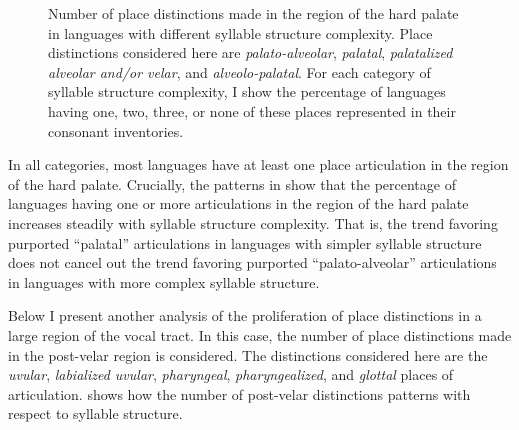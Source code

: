 \begin{figure}
\caption{\label{fig:4.10} Number of place distinctions made in the region of the hard palate in languages with different syllable structure complexity. Place distinctions considered here are \textit{palato-alveolar}, \textit{palatal}, \textit{palatalized alveolar and/or velar}, and \textit{alveolo-palatal}. For each category of syllable structure complexity, I show the percentage of languages having one, two, three, or none of these places represented in their consonant inventories.}
\end{figure}

  In all categories, most languages have at least one place articulation in the region of the hard palate. Crucially, the patterns in  show that the percentage of languages having one or more articulations in the region of the hard palate increases steadily with syllable structure complexity. That is, the trend favoring purported ``palatal'' articulations in languages with simpler syllable structure does not cancel out the trend favoring purported ``palato-alveolar'' articulations in languages with more complex syllable structure.

  Below I present another analysis of the proliferation of place distinctions in a large region of the vocal tract. In this case, the number of place distinctions made in the post-velar region is considered. The distinctions considered here are the \textit{uvular}, \textit{labialized uvular}, \textit{pharyngeal}, \textit{pharyngealized}, and \textit{glottal} places of articulation.  shows how the number of post-velar distinctions patterns with respect to syllable structure.

